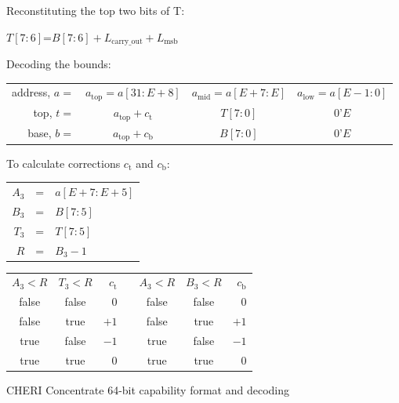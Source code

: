 \begin{figure}
Reconstituting the top two bits of T:
\begin{center}
$T[7:6] $=$ B[7:6] + L_\text{carry\_out} + L_\text{msb}$
\end{center}

Decoding the bounds:
\begin{center}
{
\renewcommand{\arraystretch}{1.5}
\begin{tabular}{r|c|c|c|}
\cline{2-4}
address, $a =$ & $a_\text{top} = a[31:E+8]$ & $a_\text{mid} = a[E+7:E]$  & $a_\text{low} = a[E-1:0]$ \\ \cline{2-4}
top, $t =$     & $a_\text{top}+c_\text{t}$   & $T[7:0]$                   & $0$'$E$ \\ \cline{2-4}
base, $b =$    & $a_\text{top}+c_\text{b}$   & $B[7:0]$                   & $0$'$E$ \\ \cline{2-4}
\end{tabular}
}
\end{center}

To calculate corrections $c_\text{t}$ and $c_\text{b}$:

\begin{center}
\begin{tabular}{r c l}
  $A_3$ &=& $a[E+7:E+5]$ \\
  $B_3$ &=& $B[7:5]$     \\
  $T_3$ &=& $T[7:5]$     \\
  $R$   &=& $B_3 - 1$      \\
\end{tabular}
\end{center}

\begin{center}
\begin{tabular}{@{}ccr@{}p{1em}@{}ccr@{}}
\cmidrule[\heavyrulewidth]{1-3}\cmidrule[\heavyrulewidth]{5-7}
$A_3<R$ & $T_3<R$ & $c_\text{t}$&&$A_3<R$ & $B_3<R$ & $c_\text{b}$\\
\cmidrule{1-3}\cmidrule{5-7}
false & false & $0$  &&false & false & $0$  \\
false & true  & $+1$ &&false & true  & $+1$ \\
true  & false & $-1$ &&true  & false & $-1$ \\
true  & true  & $0$  &&true  & true  & $0$  \\
\cmidrule[\heavyrulewidth]{1-3}\cmidrule[\heavyrulewidth]{5-7}
\end{tabular}
\end{center}
\caption{CHERI Concentrate 64-bit capability format and decoding}
\label{fig:cheric64}
\vspace{-1.5em}
\end{figure}

